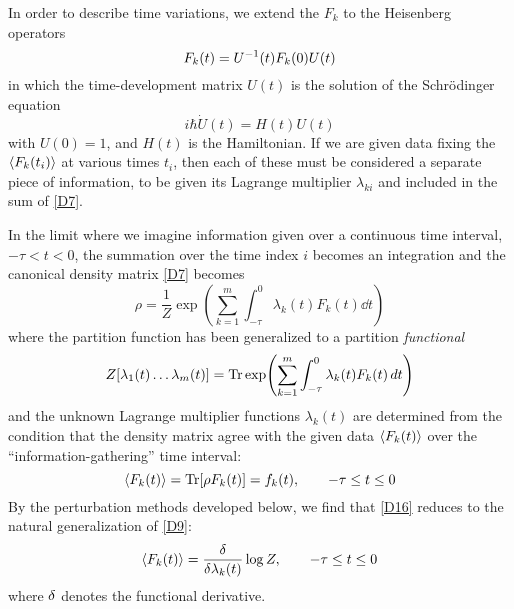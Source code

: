 In order to describe time variations, we extend the $F_k$ to the Heisenberg operators
\begin{equation}
	\label{D12}
	F_k(t) = U^{-1}(t) F_k(0) U(t)
\end{equation}
in which the time-development matrix $U(t)$ is the solution of the Schrö\-dinger equation
\begin{equation}
	i\hbar \dot{U}(t) = H(t)U(t)
\end{equation}
with $U(0)=1$, and $H(t)$ is the Hamiltonian.
If we are given data fixing the $\langle F_k(t_i)\rangle$ at various times $t_i$, then each of these must be considered a separate piece of information, to be given its Lagrange multiplier $\lambda_{ki}$ and included in the sum of \eqref{D7}.

In the limit where we imagine information given over a continuous time interval, $-\tau < t < 0$, the summation over the time index $i$ becomes an integration and the canonical density matrix \eqref{D7} becomes
\begin{equation}
	\rho = \frac{1}{Z} \exp\left(\sum_{k=1}^{m} \int_{-\tau}^{0} \lambda_k(t) F_k(t) \dd t\right)
\end{equation}
where the partition function has been generalized to a partition \emph{functional}
\begin{equation}
	Z[\lambda_1(t) \ldots \lambda_m(t)] = \Tr \exp\left(\sum_{k=1}^{m} \int_{-\tau}^{0} \lambda_k(t) F_k(t) \dd t\right)
\end{equation}
and the unknown Lagrange multiplier functions $\lambda_k(t)$ are determined from the condition that the density matrix agree with the given data $\langle F_k(t)\rangle$ over the ``information-gathering'' time interval:
\begin{equation}
	\label{D16}
	\langle F_k(t)\rangle = \operatorname{Tr}[\rho F_k(t)] = f_k(t), \qquad -\tau \leq t \leq 0
\end{equation}
By the perturbation methods developed below, we find that \eqref{D16} reduces to the natural generalization of \eqref{D9}:
\begin{equation}
	\label{D17}
	\mean{F_k(t)} = \fdv*{\log Z}{\lambda_k(t)}, \qquad -\tau \leq t \leq 0
\end{equation}
where $\mathop{}\!\delta$ denotes the functional derivative.

